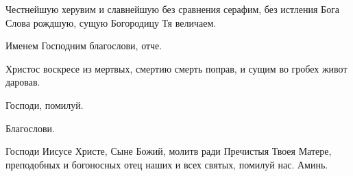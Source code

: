 \begin{mymulticols}
Честнейшую херувим и славнейшую без сравнения серафим, без истления Бога Слова рождшую, сущую Богородицу Тя величаем. 

Именем Господним благослови, отче. 

 \MolitvamiSviatyhOtecNashih 

 Христос воскресе из мертвых, смертию смерть поправ, и сущим во гробех живот даровав.  

\slavainynen

Господи, помилуй. 

Благослови. 

 Господи Иисусе Христе, Сыне Божий, молитв ради Пречистыя Твоея Матере, преподобных и богоносных отец наших и всех святых, помилуй нас. Аминь. 

\end{mymulticols}

\mychapterending
